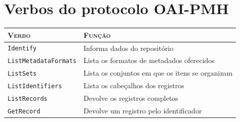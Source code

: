\chapter{Verbos do protocolo OAI-PMH}
\label{an:oai}


\begin{table}[htb]
  \centering
  \small
  \begin{tabularx}{\textwidth}{lX}
    \toprule
    \textsc{Verbo} & \textsc{Função} \\
    \midrule
    \texttt{Identify} & Informa dados do repositório \\
    \texttt{ListMetadataFormats} & Lista os formatos de metadados oferecidos \\
    \texttt{ListSets} & Lista os conjuntos em que os itens se organizam \\
    \texttt{ListIdentifiers} & Lista os cabeçalhos dos registros \\
    \texttt{ListRecords} & Devolve os registros completos \\
    \texttt{GetRecord} & Devolve um registro pelo identificador \\
    \bottomrule
  \end{tabularx}
\end{table}
